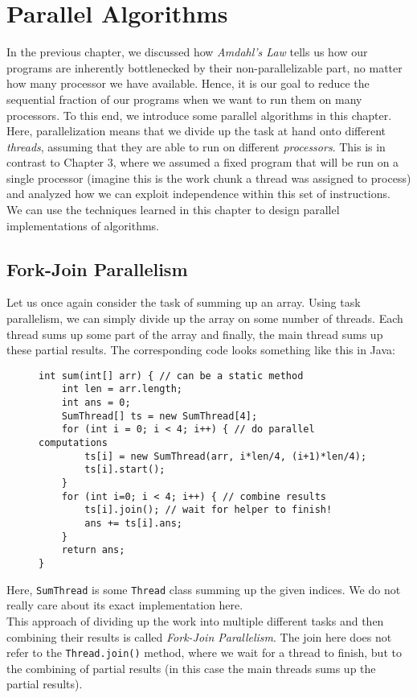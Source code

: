 \documentclass[main.tex]{subfiles}
\begin{document}
\addtolength{\tabcolsep}{-2pt}

\section{Parallel Algorithms}
In the previous chapter, we discussed how \textit{Amdahl's Law} tells us how our programs are inherently bottlenecked by their non-parallelizable part, no matter how many processor we have available. Hence, it is our goal to reduce the sequential fraction of our programs when we want to run them on many processors. To this end, we introduce some parallel algorithms in this chapter. Here, parallelization means that we divide up the task at hand onto different \textit{threads}, assuming that they are able to run on different \textit{processors}. This is in contrast to Chapter 3, where we assumed a fixed program that will be run on a single processor (imagine this is the work chunk a thread was assigned to process) and analyzed how we can exploit independence within this set of instructions.\\
We can use the techniques learned in this chapter to design parallel implementations of algorithms.

\subsection{Fork-Join Parallelism}
Let us once again consider the task of summing up an array. Using task parallelism, we can simply divide up the array on some number of threads. Each thread sums up some part of the array and finally, the main thread sums up these partial results. The corresponding code looks something like this in Java:
\begin{figure}[H]
    \begin{verbatim}
int sum(int[] arr) { // can be a static method
    int len = arr.length;
    int ans = 0;
    SumThread[] ts = new SumThread[4];
    for (int i = 0; i < 4; i++) { // do parallel computations
        ts[i] = new SumThread(arr, i*len/4, (i+1)*len/4);
        ts[i].start();
    }
    for (int i=0; i < 4; i++) { // combine results
        ts[i].join(); // wait for helper to finish!
        ans += ts[i].ans;
    }
    return ans;
}
    \end{verbatim}
\end{figure}
\noindent Here, \texttt{SumThread} is some \texttt{Thread} class summing up the given indices. We do not really care about its exact implementation here.\\[3mm]
This approach of dividing up the work into multiple different tasks and then combining their results is called \textit{Fork-Join Parallelism}. The join here does not refer to the \texttt{Thread.join()} method, where we wait for a thread to finish, but to the combining of partial results (in this case the main threads sums up the partial results).
\end{document}
